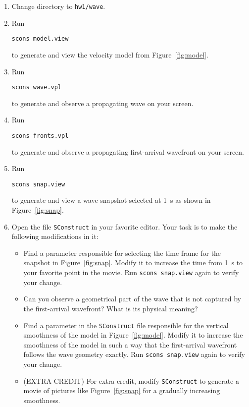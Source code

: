 \begin{enumerate}
\item Change directory to \texttt{hw1/wave}.
\item Run
\begin{verbatim}
scons model.view
\end{verbatim}
to generate and view the velocity model from Figure~\ref{fig:model}.
\item Run
\begin{verbatim}
scons wave.vpl
\end{verbatim}
to generate and observe a propagating wave on your screen.
\item Run
\begin{verbatim}
scons fronts.vpl
\end{verbatim}
to generate and observe a propagating first-arrival wavefront on your screen.
\item Run
\begin{verbatim}
scons snap.view
\end{verbatim}
to generate and view a wave snapshot selected at 1~s as shown in
Figure~\ref{fig:snap}.
\item Open the file \texttt{SConstruct} in your favorite editor. Your task is to make the following modifications in it:
\begin{itemize}
\item Find a parameter responsible for selecting the time frame for the snapshot in Figure~\ref{fig:snap}. 
Modify it to increase the time from 1~s to your favorite point in the
movie. Run \texttt{scons snap.view} again to verify your change.
\item Can you observe a geometrical part of the wave that is not captured by the first-arrival wavefront? What is its physical meaning?
\item Find a parameter in the \texttt{SConstruct} file 
responsible for the vertical smoothness of the model in Figure~\ref{fig:model}. Modify it to increase the smoothness of the model in such a way 
that the first-arrival wavefront follows the wave geometry exactly. Run \texttt{scons snap.view} again to verify your change.
\item (EXTRA CREDIT) For extra credit, modify  \texttt{SConstruct} to generate a movie of pictures like Figure~\ref{fig:snap} for a gradually increasing smoothness.
\end{itemize}
\end{enumerate}

\lstset{language=python,numbers=left,numberstyle=\tiny,showstringspaces=false}


